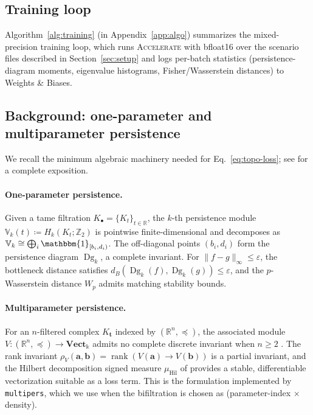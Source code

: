 \documentclass{article}
\newcommand{\Dg}{\operatorname{Dg}}
\begin{document}
\subsection{Training loop}
\label{sec:method:algo}

Algorithm~\ref{alg:training} (in Appendix~\ref{app:algo}) summarizes the
mixed-precision training loop, which runs \textsc{Accelerate} with
bfloat16 over the scenario files described in Section~\ref{sec:setup}
and logs per-batch statistics (persistence-diagram moments, eigenvalue
histograms, Fisher/Wasserstein distances) to Weights \& Biases.

\subsection{Background: one-parameter and multiparameter persistence}
\label{sec:background}

We recall the minimum algebraic machinery needed for
Eq.~\eqref{eq:topo-loss}; see
\citet{oudotAlgebraicIntroductionPersistence2026,ballesterTopologicalDataAnalysis2024}
for a complete exposition.

\paragraph{One-parameter persistence.}
Given a tame filtration $K_\bullet=\{K_t\}_{t\in\mathbb{R}}$, the
$k$-th persistence module $\mathbb{V}_k(t)\coloneqq H_k(K_t;\mathbb{Z}_2)$
is pointwise finite-dimensional and decomposes as
$\mathbb{V}_k\cong\bigoplus_i\mathbbm{1}_{[b_i,d_i)}$.  The off-diagonal
points $(b_i,d_i)$ form the persistence diagram $\Dg_k$, a complete
invariant.  For $\|f-g\|_\infty\le\varepsilon$, the bottleneck distance
satisfies $d_B(\Dg_k(f),\Dg_k(g))\le\varepsilon$, and the $p$-Wasserstein
distance $W_p$ admits matching stability bounds.

\paragraph{Multiparameter persistence.}
For an $n$-filtered complex $K_{\mathbf{t}}$ indexed by
$(\mathbb{R}^n,\preceq)$, the associated module
$V\colon(\mathbb{R}^n,\preceq)\to\mathbf{Vect}_{\mathbb{k}}$ admits no
complete discrete invariant when $n\ge 2$
\citep{carlssonTheoryMultidimensionalPersistence2009}.  The rank invariant
$\rho_V(\mathbf{a},\mathbf{b})=\operatorname{rank}(V(\mathbf{a})\to
V(\mathbf{b}))$ is a partial invariant, and the Hilbert decomposition
signed measure $\mu_{\mathrm{Hil}}$ of
\citet{loiseauxStableVectorizationMultiparameter2024a} provides a stable,
differentiable vectorization suitable as a loss term.  This is the
formulation implemented by \texttt{multipers}, which we use when the
bifiltration is chosen as (parameter-index $\times$ density).
\end{document}
